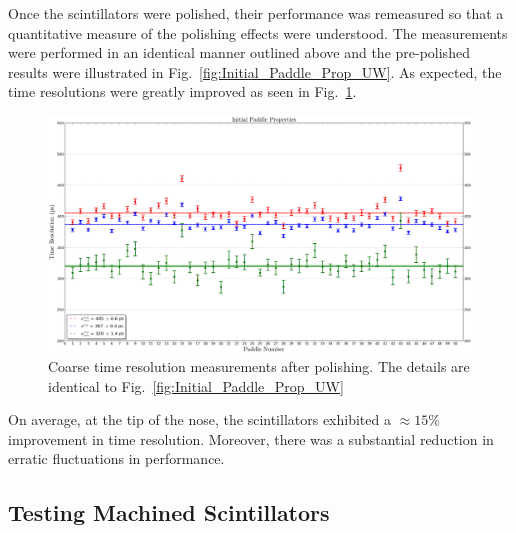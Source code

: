 Once the scintillators were polished, their performance was remeasured so that a quantitative measure of the polishing effects were understood.  The measurements were performed in an identical manner outlined above and the pre-polished results were illustrated in Fig.~\ref{fig:Initial_Paddle_Prop_UW}. As expected, the time resolutions were greatly improved as seen in Fig.~\ref{fig:Polished_Paddle_Prop_UW}.
	\begin{figure}[!htb]
		\centering
		\includegraphics[width=1.0\columnwidth]{fabrication/figs/Polished_Paddle_Prop_UW}
		\caption{Coarse time resolution measurements after polishing. The details are identical to Fig.~\ref{fig:Initial_Paddle_Prop_UW}}
		\label{fig:Polished_Paddle_Prop_UW}
	\end{figure}
On average, at the tip of the nose, the scintillators exhibited a $\approx15\%$ improvement in time resolution.  Moreover, there was a substantial reduction in erratic fluctuations in performance.

\subsection{Testing Machined Scintillators} \label{sec:fab_test}

